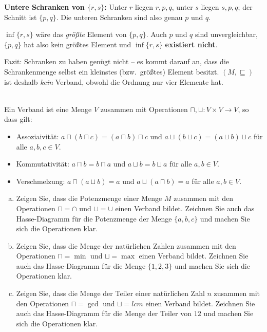 \begin{loesung}
\begin{enumerate}[a)]
  \textbf{Untere Schranken von $\{r,s\}$:} Unter $r$ liegen $r,p,q$, unter $s$ liegen $s,p,q$; der Schnitt ist $\{p,q\}$. Die unteren Schranken sind also genau $p$ und $q$.

  $\inf\{r,s\}$ wäre das \emph{größte} Element von $\{p,q\}$. Auch $p$ und $q$ sind unvergleichbar, $\{p,q\}$ hat also kein größtes Element und $\inf\{r,s\}$ \textbf{existiert nicht}.

  Fazit: Schranken zu haben genügt nicht -- es kommt darauf an, dass die Schrankenmenge selbst ein kleinstes (bzw.\ größtes) Element besitzt. $(M,\sqsubseteq)$ ist deshalb \emph{kein} Verband, obwohl die Ordnung nur vier Elemente hat.
\end{enumerate}
\end{loesung}

 \\
Ein Verband ist eine Menge $V$ zusammen mit Operationen $\sqcap, \sqcup:V\times V\to V$, so dass gilt:
\begin{itemize}
  \item Assoziaivität: $a \sqcap (b \sqcap c) = (a \sqcap b) \sqcap c$ und $a \sqcup (b \sqcup c) = (a \sqcup b) \sqcup c$ für alle $a,b,c \in V$.
  \item Kommutativität: $a \sqcap b = b \sqcap a$ und $a \sqcup b = b \sqcup a$ für alle $a,b \in V$.
  \item Verschmelzung: $a \sqcap (a \sqcup b) = a$ und $a \sqcup (a \sqcap b) = a$ für alle $a,b \in V$.
\end{itemize}
\begin{enumerate}[a)]
  \item Zeigen Sie, dass die Potenzmenge einer Menge $M$ zusammen mit den Operationen $\sqcap = \cap$ und $\sqcup = \cup$ einen Verband bildet. Zeichnen Sie auch das Hasse-Diagramm für die Potenzmenge der Menge $\{a,b,c\}$ und machen Sie sich die Operationen klar.
  \item Zeigen Sie, dass die Menge der natürlichen Zahlen zusammen mit den Operationen $\sqcap = \min$ und $\sqcup = \max$ einen Verband bildet. Zeichnen Sie auch das Hasse-Diagramm für die Menge $\{1,2,3\}$ und machen Sie sich die Operationen klar.
  \item Zeigen Sie, dass die Menge der Teiler einer natürlichen Zahl $n$ zusammen mit den Operationen $\sqcap = \gcd$ und $\sqcup = lcm$ einen Verband bildet. Zeichnen Sie auch das Hasse-Diagramm für die Menge der Teiler von $12$ und machen Sie sich die Operationen klar.
\end{enumerate}

